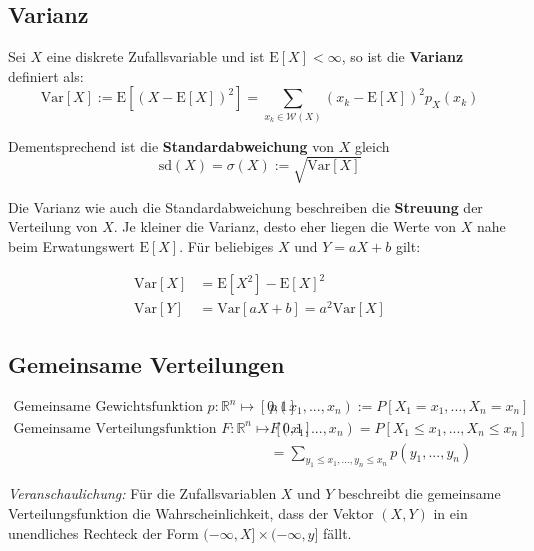 \documentclass[11pt]{article}
\newcommand{\E}{\text{E}}
\newcommand{\Var}{\text{Var}}
\begin{document}
\subsection{Varianz}

Sei $X$ eine diskrete Zufallsvariable und ist $\E[X] < \infty$, so ist die \textbf{Varianz} definiert als:
\begin{equation*}
	\Var[X] := \E[(X-\E[X])^2] = \sum_{x_k \in \mathcal{W}(X)}(x_k - \E[X])^2 p_X(x_k)
\end{equation*}

Dementsprechend ist die \textbf{Standardabweichung} von $X$ gleich
\begin{equation*}
	\text{sd}(X) = \sigma(X) := \sqrt{\Var[X]}
\end{equation*}

Die Varianz wie auch die Standardabweichung beschreiben die \textbf{Streuung} der Verteilung von $X$. Je kleiner die Varianz, desto eher liegen die Werte von $X$ nahe beim Erwatungswert $\E[X]$. F{\"u}r beliebiges $X$ und $Y = aX +b$ gilt:

\begin{equation*}
\begin{split}
	\Var[X] & = \E[X^2] - \E[X]^2 \\
	\Var[Y] & = \Var[aX +b] = a^2\Var[X]
\end{split}	
\end{equation*}

\subsection{Gemeinsame Verteilungen}

\begin{equation*}
\begin{split}
	\text{Gemeinsame Gewichtsfunktion } p: \mathbb{R}^n \mapsto [0,1] \qquad & p(x_1,...,x_n) := P[X_1 = x_1,..., X_n = x_n] \\
	\text{Gemeinsame Verteilungsfunktion } F: \mathbb{R}^n \mapsto [0,1] \qquad & F(x_1,...,x_n) = P[X_1 \leq x_1,..., X_n \leq x_n] \\
	& = \sum_{y_1 \leq x_1,...,y_n \leq x_n} p(y_1,...,y_n)
\end{split}
\end{equation*}

\emph{Veranschaulichung:} F{\"u}r die Zufallsvariablen $X$ und $Y$ beschreibt die gemeinsame Verteilungsfunktion die Wahrscheinlichkeit, dass der Vektor $(X,Y)$ in ein unendliches Rechteck der Form $(-\infty, X] \times (-\infty,y]$ f{\"a}llt.
\end{document}
